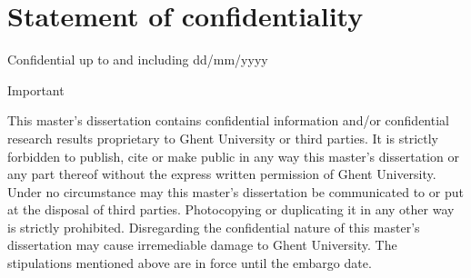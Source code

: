 \chapter*{Statement of confidentiality}

Confidential up to and including dd/mm/yyyy

Important

This master’s dissertation contains confidential information and/or confidential research results proprietary to Ghent University or third parties. It is strictly forbidden to publish, cite or make public in any way this master’s dissertation or any part thereof without the express written permission of Ghent University. Under no circumstance may this master’s dissertation be communicated to or put at the disposal of third parties. Photocopying or duplicating it in any other way is strictly prohibited. Disregarding the confidential nature of this master’s dissertation may cause irremediable damage to Ghent University. The stipulations mentioned above are in force until the embargo date.